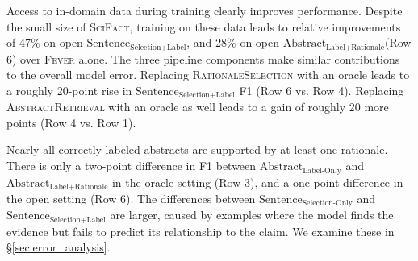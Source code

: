 \documentclass[11pt,a4paper]{article}
\newcommand{\ours}{\textsc{SciFact}\xspace}
\newcommand{\fever}{\textsc{Fever}\xspace}
\newcommand{\abstractLabelOnly}{$\textrm{Abstract}_{\textrm{Label-Only}}$\xspace}
\newcommand{\abstractLabelRationale}{$\textrm{Abstract}_{\textrm{Label+Rationale}}$\xspace}
\newcommand{\sentenceSelectionOnly}{$\textrm{Sentence}_{\textrm{Selection-Only}}$\xspace}
\newcommand{\sentenceSelectionLabel}{$\textrm{Sentence}_{\textrm{Selection+Label}}$\xspace}
\newcommand{\componentone}{\textsc{AbstractRetrieval}\xspace}
\newcommand{\componenttwo}{\textsc{RationaleSelection}\xspace}
\begin{document}
Access to in-domain data during training clearly improves performance. Despite the small size of \ours, training on these data leads to relative improvements of 47\% on open \sentenceSelectionLabel, and 28\% on open \abstractLabelRationale (Row 6) over \fever alone.
The three pipeline components make similar contributions to the overall model error. Replacing \componenttwo with an oracle leads to a roughly 20-point rise in \sentenceSelectionLabel F1 (Row 6 vs. Row 4). Replacing \componentone with an oracle as well leads to a gain of roughly 20 more points (Row 4 vs. Row 1).

Nearly all correctly-labeled abstracts are supported by at least one rationale. There is only a two-point difference in F1 between \abstractLabelOnly and \abstractLabelRationale in the oracle setting (Row 3), and a one-point difference in the open setting (Row 6). The differences between \sentenceSelectionOnly and \sentenceSelectionLabel are larger, caused by examples where the model finds the evidence but fails to predict its relationship to the claim. We examine these in \S\ref{sec:error_analysis}.
\end{document}
